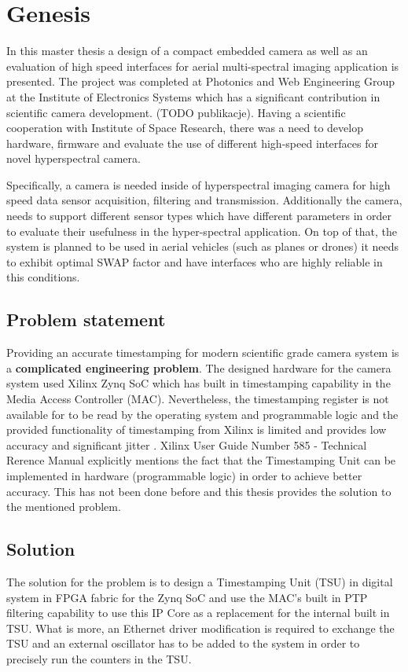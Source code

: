 \chapter{Genesis}

In this master thesis a design of a compact embedded camera as well as an evaluation of high speed interfaces for aerial multi-spectral imaging application is presented. 
The project was completed at Photonics and Web Engineering Group at the Institute of 
Electronics Systems which has a significant contribution in scientific camera development. (TODO publikacje).  Having a scientific cooperation with
Institute of Space Research, there was a need to develop hardware, firmware and evaluate the use of different high-speed interfaces for novel hyperspectral camera.

Specifically, a camera is needed inside of hyperspectral imaging camera for high speed data sensor acquisition, filtering and transmission. Additionally the camera, needs to support different sensor types which have different parameters in order to evaluate their usefulness in the hyper-spectral application. On top of that, the system is planned to be used in aerial vehicles (such as planes or drones) it needs to exhibit optimal SWAP factor and have interfaces who are highly reliable in this conditions. 

\section{Problem statement}
Providing an accurate timestamping for modern scientific grade camera system is a \textbf{complicated engineering
problem}. The designed hardware for the camera system used Xilinx Zynq SoC\cite{XIL:ZYNQ} which has built
in timestamping capability in the Media Access Controller (MAC). Nevertheless, the timestamping register is not available for
to be read by the operating system and programmable logic \cite[16.4.2]{XIL:ZYNQ_TRM} and the provided functionality of timestamping from
Xilinx is limited and provides low accuracy \cite[16.2.7]{XIL:ZYNQ_TRM} and significant jitter \cite{XIL:PTP_TESTS}. 
Xilinx User Guide Number 585 - Technical Rerence Manual explicitly mentions the fact that the Timestamping Unit can be 
implemented in hardware (programmable logic) in order to achieve better accuracy. This has not been done before and 
this thesis provides the solution to the mentioned problem. 

\section{Solution}
The solution for the problem is to design a Timestamping Unit (TSU) in digital system in FPGA fabric for the Zynq SoC
and use the MAC's built in PTP filtering capability to use this IP Core as a replacement for the internal built in TSU.
What is more, an Ethernet driver modification is required to exchange the TSU and an external oscillator has to be added
to the system in order to precisely run the counters in the TSU. 

